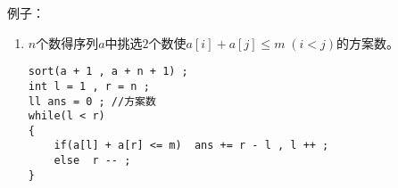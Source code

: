 \documentclass[E:/GsjzTle/main/main.tex]{subfiles}
\begin{document}
例子：

\begin{enumerate}
\item $n$个数得序列$a$中挑选$2$个数使$a[i]+a[j]\leq m \;(i < j)$的方案数。

\begin{lstlisting}
sort(a + 1 , a + n + 1) ;
int l = 1 , r = n ;
ll ans = 0 ; //方案数
while(l < r)
{
	if(a[l] + a[r] <= m)  ans += r - l , l ++ ;
	else  r -- ;
}
\end{lstlisting}
\end{enumerate}
\end{document}
